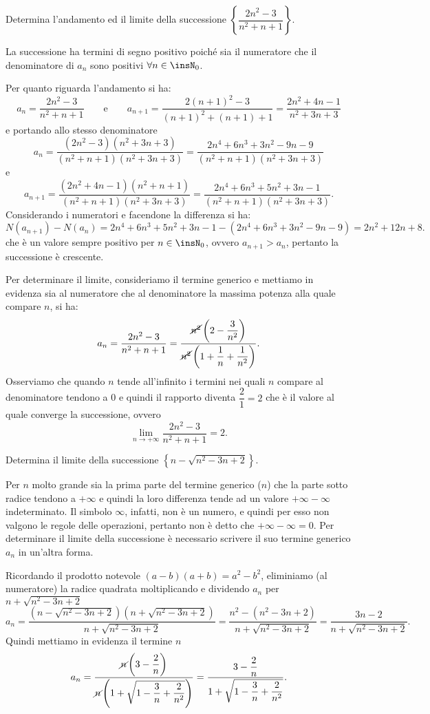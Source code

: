 \begin{exrig}
\begin{esempio}
Determina l'andamento ed il limite della successione $\left\{\dfrac{2n^2-3}{n^2+n+1}\right\}$.

La successione ha termini di segno positivo poiché sia il numeratore che il denominatore di $a_n$ sono positivi $\forall n\in\insN_0$.

Per quanto riguarda l'andamento si ha:
\[a_n=\frac{2n^2-3}{n^2+n+1}\qquad\text{e}\qquad a_{n+1}=\frac{2(n+1)^2-3}{(n+1)^2+(n+1)+1}=\frac{2n^2+4n-1}{n^2+3n+3}\]
e portando allo stesso denominatore
\[a_n=\frac{(2n^2-3)(n^2+3n+3)}{(n^2+n+1)(n^2+3n+3)}=\frac{2n^4+6n^3+3n^2−9n−9}{(n^2+n+1)(n^2+3n+3)}\]
e
\[a_{n+1}=\frac{(2n^2+4n-1)(n^2+n+1)}{(n^2+n+1)(n^2+3n+3)}=\frac{2n^4+6n^3+5n^2+3n−1}{(n^2+n+1)(n^2+3n+3)}.\]
Considerando i numeratori e facendone la differenza si ha:
\[N(a_{n+1})-N(a_n) = 2n^4+6n^3+5n^2+3n−1 - (2n^4+6n^3+3n^2−9n−9) = 2n^2+12n+8.\]
che è un valore sempre positivo per $n\in\insN_0$, ovvero $a_{n+1}>a_n$, pertanto la successione è crescente.

Per determinare il limite, consideriamo il termine generico e mettiamo in evidenza sia al numeratore che al denominatore la massima potenza alla quale compare $n$, si ha:
\[a_n=\dfrac{2n^2-3}{n^2+n+1}=\dfrac{\cancel{n^2}\left(2-\dfrac{3}{n^2}\right)}{\cancel{n^2}\left(1+\dfrac{1}{n}+\dfrac{1}{n^2}\right)}.\]
Osserviamo che quando $n$ tende all'infinito i termini nei quali $n$ compare al denominatore tendono a 0 e quindi il rapporto diventa $\dfrac{2}{1}=2$ che è il valore al quale converge la successione, ovvero
\[\lim_{n\to+\infty} \dfrac{2n^2-3}{n^2+n+1} = 2.\]
\end{esempio}

\begin{esempio}
Determina il limite della successione $\left\{n-\sqrt{n^2-3n+2}\right\}$.

Per $n$ molto grande sia la prima parte del termine generico ($n$) che la parte sotto radice tendono a $+\infty$ e quindi la loro differenza tende ad un valore $+\infty - \infty$ indeterminato. Il simbolo $\infty$, infatti, non è un numero, e quindi per esso non valgono le regole delle operazioni, pertanto non è detto che $+\infty - \infty = 0$. Per determinare il limite della successione è necessario scrivere il suo termine generico $a_n$ in un'altra forma.

Ricordando il prodotto notevole $(a-b)(a+b) = a^2-b^2$, eliminiamo (al numeratore) la radice quadrata moltiplicando e dividendo $a_n$ per $n+\sqrt{n^2-3n+2}$
\[a_n=\frac{\left(n-\sqrt{n^2-3n+2}\right)\left(n+\sqrt{n^2-3n+2}\right)}{n+\sqrt{n^2-3n+2}}= \frac{n^2-\left(n^2-3n+2\right)}{n+\sqrt{n^2-3n+2}}=\frac{3n-2}{n+\sqrt{n^2-3n+2}}.\]
Quindi mettiamo in evidenza il termine $n$
\[a_n=\frac{\cancel{n}\left(3-\dfrac{2}{n}\right)}{\cancel{n}\left(1+\sqrt{1-\dfrac{3}{n}+\dfrac{2}{n^2}}\right)}=
\frac{3-\dfrac{2}{n}}{1+\sqrt{1-\dfrac{3}{n}+\dfrac{2}{n^2}}}.\]


\end{esempio}
\end{exrig}
